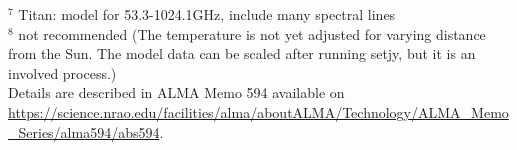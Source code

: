 \begin{table}[h!]
$^7$ Titan: model for 53.3-1024.1GHz, include many spectral lines\\
$^8$ not recommended (The temperature is not yet adjusted for
                varying distance from the Sun.  The model data can be scaled
                after running setjy, but it is an involved process.)\\
Details are described in ALMA Memo
594 available on
\url{https://science.nrao.edu/facilities/alma/aboutALMA/Technology/ALMA_Memo_Series/alma594/abs594}.

\normalsize

\end{table}



%
%

